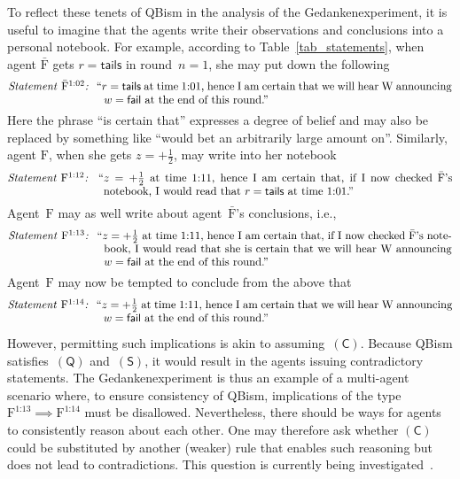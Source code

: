 \documentclass[12pt]{article}
\theoremstyle{mystyle}
\theoremstyle{definition}
\newcommand*{\Friendone}{\mathrm{\bar{F}}}
\newcommand*{\Friendtwo}{\mathrm{F}}
\newcommand*{\Wigner}{\mathrm{W}}
\newcommand*{\splus}{{\textstyle + \frac{1}{2}}}
\newcommand*{\QT}{\mathsf{(Q)}}
\newcommand*{\SW}{\mathsf{(S)}}
\newcommand*{\SelfCons}{\mathsf{(C)}}
\newcommand*{\fail}{\mathsf{fail}}
\newcommand*{\tail}{\mathsf{tails}}
\newcommand*{\asn}[1]{``#1''}
\newcommand*{\sT}[1]{{\text{\emph{Statement} $#1$\emph{:} }}}
\newcommand*{\sTM}[1]{\begin{minipage}{14cm} \hangindent=8.6em  #1 \end{minipage}}
\begin{document}
To reflect these tenets of QBism in the analysis of the Gedankenexperiment, it is useful to imagine that the agents write their observations and conclusions into a personal notebook.  For example, according to Table~\ref{tab_statements}, when agent $\Friendone$ gets $r=\tail$ in round~$n=1$, she may put down the following 
\begin{align*}
  \sTM{\sT{\Friendone^{\text{1:02}}} \asn{$r=\tail$ at time $\text{1:01}$,  hence I am certain that we will hear $\Wigner$ announcing $w = \fail$ at the end of this round.}}
\end{align*}
Here the phrase ``is certain that'' expresses a degree of belief and may also be replaced by something like ``would bet an arbitrarily large amount on''. Similarly, agent $\Friendtwo$, when she gets $z=\splus$, may write into her notebook 
\begin{align*}
  \sTM{\sT{\Friendtwo^{\text{1:12}}} \asn{$z=\splus$ at time $\text{1:11}$, hence I am certain that, if I now checked $\Friendone$'s notebook, I would read that $r=\tail$ at time $\text{1:01}$.}}
\end{align*}
Agent~$\Friendtwo$ may as well write about agent~$\Friendone$'s conclusions, i.e., 
\begin{align*}
  \sTM{\sT{\Friendtwo^{\text{1:13}}} \asn{$z=\splus$ at time $\text{1:11}$, hence I am certain that, if I now checked $\Friendone$'s notebook, I would read that she is certain that we will hear $\Wigner$ announcing $w = \fail$ at the end of this round.}}
\end{align*}
 Agent~$\Friendtwo$ may now be tempted to conclude from the above that
\begin{align*}
  \sTM{\sT{\Friendtwo^{\text{1:14}}} \asn{$z=\splus$ at time $\text{1:11}$, hence I am certain that we will hear $\Wigner$ announcing $w = \fail$ at the end of this round.}}
\end{align*}

However, permitting such implications is akin to assuming~$\SelfCons$. Because QBism  satisfies~$\QT$ and~$\SW$, it would result in the agents issuing contradictory statements. The Gedankenexperiment is thus an example of a multi-agent scenario where,  to ensure consistency of QBism, implications of the type $\Friendtwo^{\text{1:13}} \implies \Friendtwo^{\text{1:14}}$ must be disallowed.  Nevertheless, there should be ways for  agents to  consistently reason about each other. One may therefore ask whether $\SelfCons$ could be substituted by another (weaker) rule that enables such reasoning but does not lead to contradictions. This question is currently being investigated~\cite{DFS18}.
\end{document}
